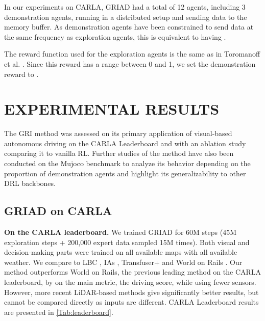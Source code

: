 \documentclass[letterpaper, 10 pt, conference]{ieeeconf}
\begin{document}
In our experiments on CARLA, GRIAD had a total of 12 agents, including 3 demonstration agents, running in a distributed setup and sending data to the memory buffer. As demonstration agents have been constrained to send data at the same frequency as exploration agents, this is equivalent to having .

The reward function used for the exploration agents is the same as in Toromanoff et al. \cite{architecture-marin}. Since this reward has a range between 0 and 1, we set the demonstration reward to .


\section{EXPERIMENTAL RESULTS}
The GRI method was assessed on its primary application of visual-based autonomous driving on the CARLA Leaderboard and with an ablation study comparing it to vanilla RL. Further studies of the method have also been conducted on the Mujoco benchmark to analyze its behavior depending on the proportion of demonstration agents and highlight its generalizability to other DRL backbones. 

\subsection{GRIAD on CARLA}

\label{sec:exp}
\textbf{On the CARLA leaderboard.} We trained GRIAD for 60M steps (45M exploration steps + 200,000 expert data sampled 15M times). Both visual and decision-making parts were trained on all available maps with all available weather. We compare to LBC \cite{lbc}, IAs \cite{architecture-marin}, Transfuser+ \cite{transfuser} and World on Rails \cite{wor}. Our method outperforms World on Rails, the previous leading method on the CARLA leaderboard, by  on the main metric, the driving score, while using fewer sensors. However, more recent LiDAR-based methods give significantly better results, but cannot be compared directly as inputs are different. CARLA Leaderboard results are presented in \cref{Tab:leaderboard}.
\end{document}
